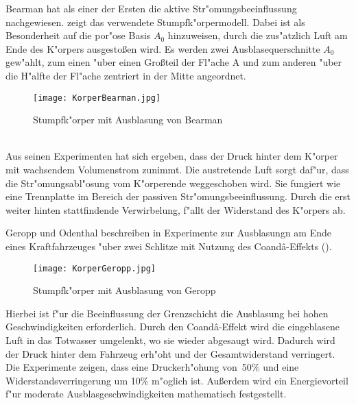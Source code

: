 Bearman \cite{Hucho.2011} hat als einer der Ersten die aktive Str"omungsbeeinflussung nachgewiesen.  zeigt das verwendete Stumpfk"orpermodell. Dabei ist als Besonderheit auf die por"ose Basis \(A_{0}\) hinzuweisen, durch die zus"atzlich Luft am Ende des K"orpers ausgesto\ss{}en wird. Es werden zwei Ausblasequerschnitte \(A_{0}\) gew"ahlt, zum einen "uber einen Gro\ss{}teil der Fl"ache A und zum anderen "uber die H"alfte der Fl"ache zentriert in der Mitte angeordnet.
\begin{figure}[h]
	\centering
	\texttt{[image: KorperBearman.jpg]}
	\caption{Stumpfk"orper mit Ausblasung von Bearman \cite{Hucho.2011}}
	\label{fig:Bearman}
\end{figure}\\
Aus seinen Experimenten \cite{Hucho.2011} hat sich ergeben, dass der Druck hinter dem K"orper mit wachsendem Volumenstrom zunimmt. Die austretende Luft sorgt daf"ur, dass die Str"omungsabl"osung vom K"orperende weggeschoben wird. Sie fungiert wie eine Trennplatte im Bereich der passiven Str"omungsbeeinflussung. Durch die erst weiter hinten stattfindende Verwirbelung, f"allt der Widerstand des K"orpers ab.

Geropp und Odenthal beschreiben in \cite{Geropp.2000} Experimente zur Ausblasungn am Ende eines Kraftfahrzeuges "uber zwei Schlitze mit Nutzung des Coand\^{a}-Effekts ().
\begin{figure}[h]
	\centering
	\texttt{[image: KorperGeropp.jpg]}
	\caption{Stumpfk"orper mit Ausblasung von Geropp \cite{Geropp.2000}}
	\label{fig:Geropp}
\end{figure}

Hierbei ist f"ur die Beeinflussung der Grenzschicht die Ausblasung bei hohen Geschwindigkeiten erforderlich. Durch den Coand\^{a}-Effekt wird die eingeblasene Luft in das Totwasser umgelenkt, wo sie wieder abgesaugt wird. Dadurch wird der Druck hinter dem Fahrzeug erh"oht und der Gesamtwiderstand verringert. Die Experimente zeigen, dass eine Druckerh"ohung von~50\% und eine Widerstandsverringerung um 10\% m"oglich ist. Au\ss{}erdem wird ein Energievorteil f"ur moderate Ausblasgeschwindigkeiten mathematisch festgestellt.

